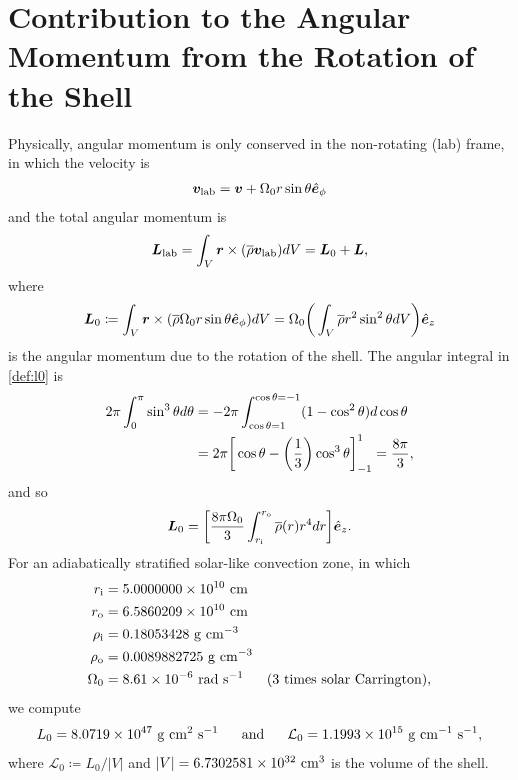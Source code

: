 \documentclass[12pt]{article} %
\newcommand{\andd}{\text{and}\ \ \ \ \ }
\newcommand{\five}{\ \ \ \ \ }
\newcommand{\e}{\hat{\bm{e}}}
\newcommand{\rhobar}{\overline{\rho}}
\newcommand{\ri}{r_{\rm{i}}}
\newcommand{\ro}{r_{\rm{o}}}
\begin{document}
\section{Contribution to the Angular Momentum from the Rotation of the Shell}
Physically, angular momentum is only conserved in the non-rotating (lab) frame, in which the velocity is
\begin{align}
\bm{v}_{\rm{lab}} = \bm{v} + \Omega_0r\sin\theta\e_\phi
\end{align}
and the total angular momentum is
\begin{align}
\bm{L}_{\rm{lab}} = \int_V \bm{r}\times(\rhobar\bm{v}_{\rm{lab}})dV = \bm{L}_0 + \bm{L}, 
\end{align}
where
\begin{align}
\bm{L}_0 \coloneqq \int_V \bm{r}\times(\rhobar\Omega_0r\sin\theta\e_\phi)dV = \Omega_0\bigg{(}\int_V\rhobar r^2\sin^2\theta dV\bigg{)}\e_z
\label{def:l0}
\end{align}
is the angular momentum due to the rotation of the shell. The angular integral in \eqref{def:l0} is
\begin{align*}
2\pi\int_0^\pi\sin^3\theta d\theta &= -2\pi \int_{\cos\theta=1}^{\cos\theta=-1}(1-\cos^2\theta)d\cos\theta\\
&= 2\pi\bigg{[}\cos\theta - \bigg{(}\frac{1}{3}\bigg{)}\cos^3\theta\bigg{]}_{-1}^1 = \frac{8\pi}{3},
\end{align*}
and so 
\begin{align}
\bm{L}_0 = \bigg{[}\frac{8\pi\Omega_0}{3}\int_{\ri}^{\ro}\rhobar(r)r^4dr\bigg{]}\e_z. 
\end{align}
For an adiabatically stratified solar-like convection zone, in which
\begin{align*}
\ri  &= 5.0000000\times 10^{10}\ \rm{cm}\\
\ro &= 6.5860209\times 10^{10}\ \rm{cm}\\
\rho_{\rm{i}} &= 0.18053428\ \rm{g}\ \rm{cm}^{-3}\\
\rho_{\rm{o}} &= 0.0089882725\ \rm{g}\ \rm{cm}^{-3}\\
\Omega_0  &= 8.61\times 10^{-6}\ \rm{rad}\ \rm{s}^{-1}\five \text{(3 times solar Carrington)}, 
\end{align*}
we compute
\begin{align}
L_0 = 8.0719\times 10^{47}\ \rm{g}\ \rm{cm}^2\ \rm{s}^{-1}\five \andd \mathcal{L}_0 = 1.1993\times 10^{15}\ \rm{g}\ \rm{cm}^{-1}\ \rm{s}^{-1}, 
\end{align}
where $\mathcal{L}_0 \coloneqq L_0/|V|$ and $|V| = 6.7302581\times10^{32}\ \rm{cm}^3$ is the volume of the shell. 
\end{document}
